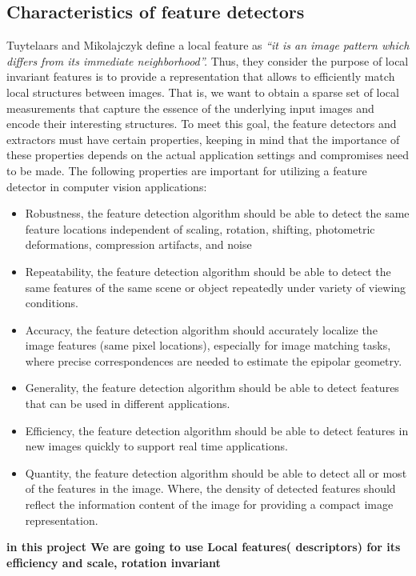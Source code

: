 \subsection{Characteristics of feature detectors}

Tuytelaars and Mikolajczyk \cite{MM} define a local feature as \textit{ “it is an image pattern
which differs from its immediate neighborhood”.} Thus, they consider the purpose of
local invariant features is to provide a representation that allows to efficiently match
local structures between images. That is, we want to obtain a sparse set of local
measurements that capture the essence of the underlying input images and encode
their interesting structures. To meet this goal, the feature detectors and extractors
must have certain properties, keeping in mind that the importance of these properties
depends on the actual application settings and compromises need to be made. The
following properties are important for utilizing a feature detector in computer vision
applications:
\begin{itemize}
\item Robustness, the feature detection algorithm should be able to detect the same feature
locations independent of scaling, rotation, shifting, photometric deformations,
compression artifacts, and noise
\item Repeatability, the feature detection algorithm should be able to detect the same
features of the same scene or object repeatedly under variety of viewing conditions.
\item Accuracy, the feature detection algorithm should accurately localize the image
features (same pixel locations), especially for image matching tasks, where precise
correspondences are needed to estimate the epipolar geometry.
\item Generality, the feature detection algorithm should be able to detect features that
can be used in different applications.
\item Efficiency, the feature detection algorithm should be able to detect features in new
images quickly to support real time applications.
\item Quantity, the feature detection algorithm should be able to detect all or most of the
features in the image. Where, the density of detected features should reflect the
information content of the image for providing a compact image representation.
\end{itemize}

\textbf{in this project We are going to use Local features( descriptors) for its efficiency and scale, rotation  invariant }\\
